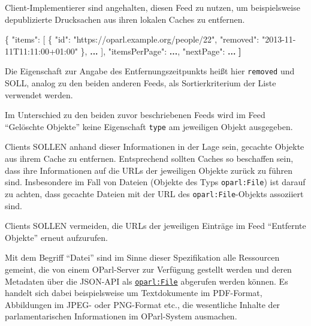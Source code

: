 \documentclass[,a4paper]{article}
\newenvironment{Shaded}{}{}
\newcommand{\DataTypeTok}[1]{\textcolor[rgb]{0.56,0.13,0.00}{{#1}}}
\newcommand{\StringTok}[1]{\textcolor[rgb]{0.25,0.44,0.63}{{#1}}}
\newcommand{\OtherTok}[1]{\textcolor[rgb]{0.00,0.44,0.13}{{#1}}}
\newcommand{\FunctionTok}[1]{\textcolor[rgb]{0.02,0.16,0.49}{{#1}}}
\newcommand{\ErrorTok}[1]{\textcolor[rgb]{1.00,0.00,0.00}{\textbf{{#1}}}}
\begin{document}
Client-Implementierer sind angehalten, diesen Feed zu nutzen, um
beispielsweise depublizierte Drucksachen aus ihren lokalen Caches zu
entfernen.

\begin{Shaded}
\begin{Highlighting}[]
\FunctionTok{\{}
    \DataTypeTok{"items"}\FunctionTok{:} \OtherTok{[}
        \FunctionTok{\{}
            \DataTypeTok{"id"}\FunctionTok{:} \StringTok{"https://oparl.example.org/people/22"}\FunctionTok{,}
            \DataTypeTok{"removed"}\FunctionTok{:} \StringTok{"2013-11-11T11:11:00+01:00"}
        \FunctionTok{\}}\OtherTok{,}
        \ErrorTok{...}
    \OtherTok{]}\FunctionTok{,}
    \DataTypeTok{"itemsPerPage"}\FunctionTok{:} \ErrorTok{...}\FunctionTok{,}
    \DataTypeTok{"nextPage"}\FunctionTok{:} \ErrorTok{...}
\ErrorTok{]}
\end{Highlighting}
\end{Shaded}

Die Eigenschaft zur Angabe des Entfernungszeitpunkts heißt hier
\texttt{removed} und SOLL, analog zu den beiden anderen Feeds, als
Sortierkriterium der Liste verwendet werden.

Im Unterschied zu den beiden zuvor beschriebenen Feeds wird im Feed
``Gelöschte Objekte'' keine Eigenschaft \texttt{type} am jeweiligen
Objekt ausgegeben.

Clients SOLLEN anhand dieser Informationen in der Lage sein, gecachte
Objekte aus ihrem Cache zu entfernen. Entsprechend sollten Caches so
beschaffen sein, dass ihre Informationen auf die URLs der jeweiligen
Objekte zurück zu führen sind. Insbesondere im Fall von Dateien (Objekte
des Typs \texttt{oparl:File}) ist darauf zu achten, dass gecachte
Dateien mit der URL des \texttt{oparl:File}-Objekts assoziiert sind.

Clients SOLLEN vermeiden, die URLs der jeweiligen Einträge im Feed
``Entfernte Objekte'' erneut aufzurufen.


Mit dem Begriff ``Datei'' sind im Sinne dieser Spezifikation alle
Ressourcen gemeint, die von einem OParl-Server zur Verfügung gestellt
werden und deren Metadaten über die JSON-API als
\hyperref[oparlux5ffile]{\texttt{oparl:File}} abgerufen werden können.
Es handelt sich dabei beispielsweise um Textdokumente im PDF-Format,
Abbildungen im JPEG- oder PNG-Format etc., die wesentliche Inhalte der
parlamentarischen Informationen im OParl-System ausmachen.
\end{document}
